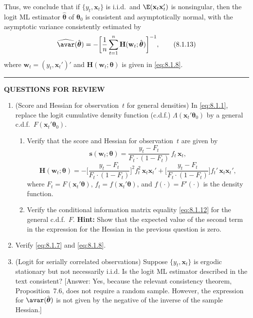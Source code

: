 Thus, we conclude that if $\{y_t, \mathbf{x}_t\}$ is i.i.d.\ and $\E(\mathbf{x}_t\mathbf{x}_t')$ is nonsingular, then the
logit ML estimator $\hat{\boldsymbol{\theta}}$ of $\boldsymbol{\theta}_0$ is consistent and asymptotically normal, with the asymptotic variance consistently estimated by
\begin{equation}
  \widehat{\avar}(\hat{\boldsymbol{\theta}})
  = -\biggl[\frac{1}{n}\sum_{t=1}^{n}
    \mathbf{H}(\mathbf{w}_t; \hat{\boldsymbol{\theta}})\biggr]^{-1},
  \label{eq:8.1.13} \tag{8.1.13}
\end{equation}
where $\mathbf{w}_t = (y_t, \mathbf{x}_t')'$ and $\mathbf{H}(\mathbf{w}_t; \boldsymbol{\theta})$ is given in \eqref{eq:8.1.8}.

\bigskip
\noindent\rule{\textwidth}{0.4pt}
\textbf{QUESTIONS FOR REVIEW}
\medskip

\begin{enumerate}
\item (Score and Hessian for observation~$t$ for general densities)\quad
  In \eqref{eq:8.1.1}, replace the logit cumulative density function (c.d.f.)
  $\Lambda(\mathbf{x}_t'\boldsymbol{\theta}_0)$ by a general c.d.f.\ $F(\mathbf{x}_t'\boldsymbol{\theta}_0)$.

  \begin{enumerate}[label=(\alph*)]
  \item Verify that the score and Hessian for observation~$t$ are given by
    \[
      \mathbf{s}(\mathbf{w}_t; \boldsymbol{\theta})
      = \frac{y_t - F_t}{F_t \cdot (1 - F_t)}\,f_t\,\mathbf{x}_t,
    \]
    \[
      \mathbf{H}(\mathbf{w}_t; \boldsymbol{\theta})
      = -\biggl[\frac{y_t - F_t}{F_t \cdot (1 - F_t)}\biggr]^2
        f_t^2\,\mathbf{x}_t\mathbf{x}_t'
        + \biggl[\frac{y_t - F_t}{F_t \cdot (1 - F_t)}\biggr]
        f_t'\,\mathbf{x}_t\mathbf{x}_t',
    \]
    where $F_t = F(\mathbf{x}_t'\boldsymbol{\theta})$,
    $f_t = f(\mathbf{x}_t'\boldsymbol{\theta})$, and
    $f(\cdot) = F'(\cdot)$ is the density function.

  \item Verify the conditional information matrix equality \eqref{eq:8.1.12} for the general
    c.d.f.\ $F$. \textbf{Hint:} Show that the expected value of the second term in the
    expression for the Hessian in the previous question is zero.
  \end{enumerate}

\item Verify \eqref{eq:8.1.7} and \eqref{eq:8.1.8}.

\item (Logit for serially correlated observations)\quad
  Suppose $\{y_t, \mathbf{x}_t\}$ is ergodic stationary but not necessarily i.i.d.
  Is the logit ML estimator described in the text consistent?
  [Answer: Yes, because the relevant consistency theorem, Proposition~7.6,
  does not require a random sample. However, the expression for
  $\avar(\hat{\boldsymbol{\theta}})$ is not given by the negative of the inverse of the sample Hessian.]
\end{enumerate}
